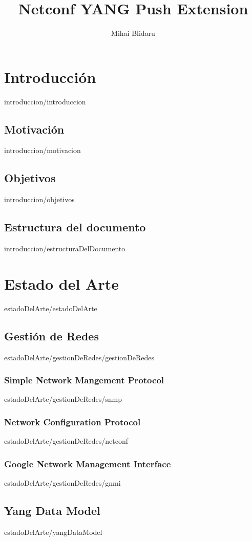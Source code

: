 \documentclass[epsbased, copyright, final, covers, overleaf, printable, extendedindex, firstnumbered, tfg]{tfgtfmthesisuam}
\title{Netconf YANG Push Extension}
\author{Mihai Blidaru}
\begin{document}


\chapter{Introducción\label{CAP:INTRODUCION}}{introduccion/introduccion}
  \section{Motivación\label{SEC:MOTIVACION}}{introduccion/motivacion}
  \section{Objetivos\label{SEC:OBJETIVOS}}{introduccion/objetivos}
  \section{Estructura del documento\label{SEC:ESTRUCTURA_DEL_DOCUMENTO}}{introduccion/estructuraDelDocumento}

\chapter{Estado del Arte\label{CAP:ESTADO_DEL_ARTE}}{estadoDelArte/estadoDelArte}
  \section{Gestión de Redes\label{SEC:GESTION_DE_REDES}}{estadoDelArte/gestionDeRedes/gestionDeRedes}
    \subsection{Simple Network Mangement Protocol\label{SUBSEC:SNMP}}{estadoDelArte/gestionDeRedes/snmp}
    \subsection{Network Configuration Protocol\label{SUBSEC:NETCONF}}{estadoDelArte/gestionDeRedes/netconf}
    \subsection{Google Network Management Interface\label{SUBSEC:GNMI}}{estadoDelArte/gestionDeRedes/gnmi}
  \section{Yang Data Model\label{SEC:YANG_DATA_MODEL}}{estadoDelArte/yangDataModel}
\end{document}
